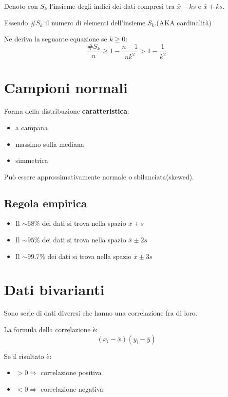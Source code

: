 Denoto con $S_k$ l'insieme degli indici dei dati compresi tra $\bar{x}-ks$ e $\bar{x}+ks$.

Essendo $\#S_k$ il numero di elementi dell'insieme $S_k$.(AKA cardinalità) 

Ne deriva la seguante equazione se $k \geq 0$:
\begin{equation}
   \displaystyle\frac{\#S_k}{n} \geq 1 - \displaystyle\frac{n - 1}{n k^2} > 1 - \displaystyle\frac{1}{k^2} 
\end{equation}


\section{Campioni normali}
Forma della distribuzione \textbf{caratteristica}:
\begin{itemize}
    \item a campana
    \item massimo sulla mediana
    \item simmetrica
\end{itemize}

Può essere approssimativamente normale o sbilanciata(skewed).


\subsection{Regola empirica}
\begin{itemize}
    \item Il $\sim 68\%$ dei dati si trova nella spazio $\bar{x} \pm s$
    \item Il $\sim 95\%$ dei dati si trova nella spazio $\bar{x} \pm 2s$
    \item Il $\sim 99.7\%$ dei dati si trova nella spazio $\bar{x} \pm 3s$
\end{itemize}


\section{Dati bivarianti}

Sono serie di dati diverrsi che hanno una correlazione fra di loro. 

La formula della correlazione è:
\begin{equation}
    (x_i - \bar{x})(y_i - \bar{y})
\end{equation}


Se il risultato è:
\begin{itemize}
    \item $> 0 \Rightarrow$ correlazione positiva
    \item $< 0 \Rightarrow$ correlazione negativa
\end{itemize}


